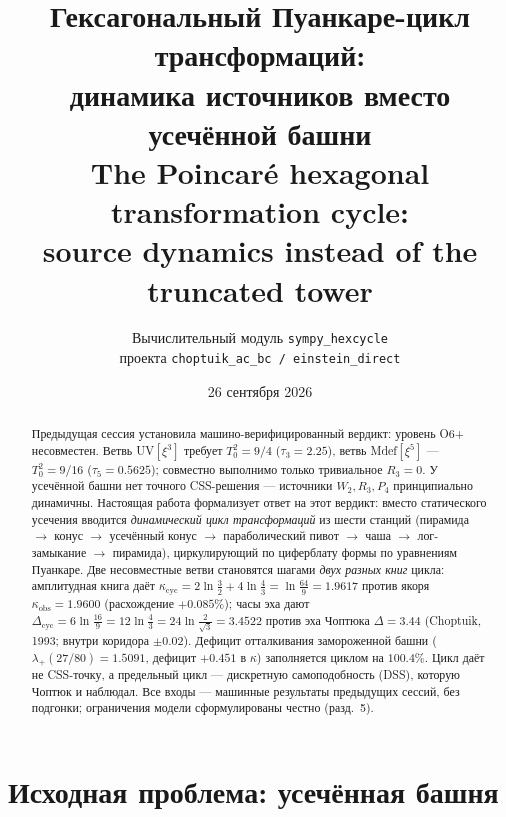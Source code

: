\documentclass[11pt,a4paper]{article}
\title{\bfseries Гексагональный Пуанкаре-цикл трансформаций:\\
динамика источников вместо усечённой башни\\[4pt]
\large The Poincar\'e hexagonal transformation cycle:\\
source dynamics instead of the truncated tower}
\author{Вычислительный модуль \texttt{sympy\_hexcycle}\\
проекта \texttt{choptuik\_ac\_bc / einstein\_direct}}
\date{26 сентября 2026}
\newcommand{\kap}{\kappa_{\mathrm{cyc}}}
\newcommand{\Dcy}{\Delta_{\mathrm{cyc}}}
\newcommand{\tauu}{\tau_{3}}
\newcommand{\tauf}{\tau_{5}}
\begin{document}
\maketitle

\begin{abstract}
Предыдущая сессия установила машино-верифицированный вердикт: уровень O6+
несовместен. Ветвь UV$[\xi^3]$ требует $T_0^2 = 9/4$ ($\tauu = 2.25$), ветвь
Mdef$[\xi^5]$ --- $T_0^2 = 9/16$ ($\tauf = 0.5625$); совместно выполнимо только
тривиальное $R_3 = 0$. У усечённой башни нет точного CSS-решения ---
источники $W_2, R_3, P_4$ принципиально динамичны. Настоящая работа
формализует ответ на этот вердикт: вместо статического усечения вводится
\emph{динамический цикл трансформаций} из шести станций (пирамида $\to$ конус
$\to$ усечённый конус $\to$ параболический пивот $\to$ чаша $\to$
лог-замыкание $\to$ пирамида), циркулирующий по циферблату формы по уравнениям
Пуанкаре. Две несовместные ветви становятся шагами \emph{двух разных книг}
цикла: амплитудная книга даёт $\kap = 2\ln\frac32 + 4\ln\frac43 = \ln\frac{64}{9}
= 1.9617$ против якоря $\kappa_{\mathrm{obs}} = 1.9600$ (расхождение
$+0.085\%$); часы эха дают $\Dcy = 6\ln\frac{16}{9} = 12\ln\frac43 =
24\ln\frac{2}{\sqrt3} = 3.4522$ против эха Чоптюка $\Delta = 3.44$ (Choptuik, 1993; внутри коридора $\pm0.02$).
Дефицит отталкивания замороженной башни ($\lambda_+(27/80) = 1.5091$,
дефицит $+0.451$ в $\kappa$) заполняется циклом на $100.4\%$. Цикл даёт не
CSS-точку, а предельный цикл --- дискретную самоподобность (DSS), которую
Чоптюк и наблюдал. Все входы --- машинные результаты предыдущих сессий,
без подгонки; ограничения модели сформулированы честно (разд.~5).
\end{abstract}

\section{Исходная проблема: усечённая башня}
\end{document}
